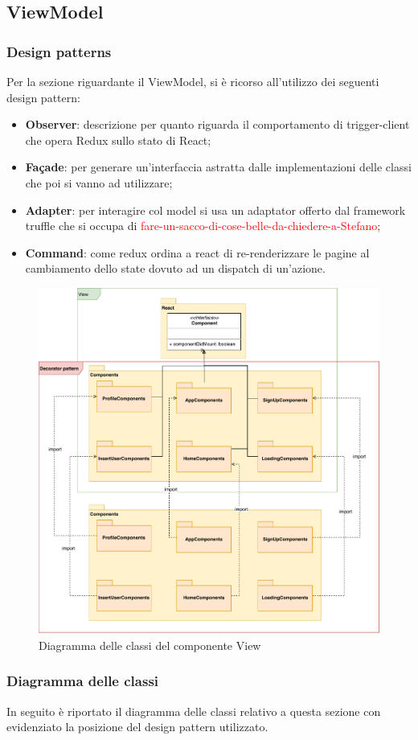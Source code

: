	
	\subsection{ViewModel}
		\subsubsection{Design patterns}
		Per la sezione riguardante il ViewModel, si è ricorso all'utilizzo dei seguenti design pattern:
			\begin{itemize}
				\item \textbf{Observer}: descrizione per quanto riguarda il comportamento di trigger-client che opera Redux sullo stato di React;
				\item \textbf{Façade}: per generare un'interfaccia astratta dalle implementazioni delle classi che poi si vanno ad utilizzare;
				\item \textbf{Adapter}: per interagire col model si usa un adaptator offerto dal framework truffle che si occupa di {\textcolor{red}{fare-un-sacco-di-cose-belle-da-chiedere-a-Stefano}};
				\item \textbf{Command}: come redux ordina a react di re-renderizzare le pagine al cambiamento dello state dovuto ad un dispatch di un'azione.
			\end{itemize}
				\begin{figure}[!h]
		\centering
			\includegraphics[height=0.5\textwidth]{./Diagrammi/DiagrammaView.pdf}
		\caption{Diagramma delle classi del componente View}
		\label{fig:DiagrammaView}
	\end{figure}
	
		\subsubsection{Diagramma delle classi}
		In seguito è riportato il diagramma delle classi relativo a questa sezione con evidenziato la posizione del design pattern utilizzato.
	
